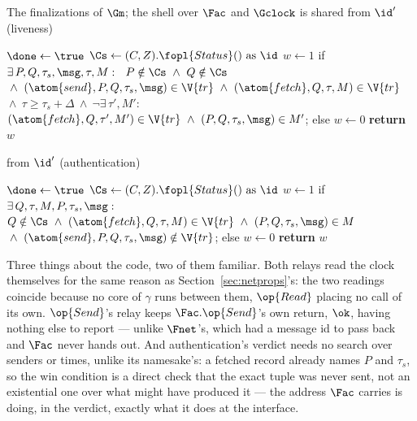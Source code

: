\documentclass[10pt,oneside,openany]{book}
\theoremstyle{accentdef}
\theoremstyle{accentplain}
\begin{document}
\begin{interface}[nofloat]{The finalizations of $\Gm$; the shell over $\Fac$ and $\Gclock$ is shared}
 \quad from $\id'$ \quad (liveness)
\begin{algorithmic}[1]
\algcont
\Req{$\neg\done$}
\State $\done \gets \true$
\State $\Cs \gets (C,Z).\fopl{Status}() \text{ as } \id$
\State $w \gets 1$ if $\exists\, P,Q,\tau_s,\msg,\tau,M :\ \
       P \notin \Cs \ \wedge\ Q \notin \Cs$ \label{ln:gacliv}
\State \quad ${}\wedge\ (\atom{send},P,Q,\tau_s,\msg) \in \V{tr}
       \ \wedge\ (\atom{fetch},Q,\tau,M) \in \V{tr}$
\State \quad ${}\wedge\ \tau \geq \tau_s + \Delta
       \ \wedge\ \neg\exists\, \tau',M' :$
\State \qquad $(\atom{fetch},Q,\tau',M') \in \V{tr} \ \wedge\ (P,Q,\tau_s,\msg) \in M'$;
\State else $w \gets 0$
\State \textbf{return} $w$
\algsave
\end{algorithmic}
\vspace{1.4ex}

 \quad from $\id'$ \quad (authentication)
\begin{algorithmic}[1]
\algcont
\Req{$\neg\done$}
\State $\done \gets \true$
\State $\Cs \gets (C,Z).\fopl{Status}() \text{ as } \id$
\State $w \gets 1$ if $\exists\, Q,\tau,M,P,\tau_s,\msg :$ \label{ln:gacauth}
\State \quad $Q \notin \Cs \ \wedge\ (\atom{fetch},Q,\tau,M) \in \V{tr} \ \wedge\ (P,Q,\tau_s,\msg) \in M$
\State \quad ${}\wedge\ (\atom{send},P,Q,\tau_s,\msg) \notin \V{tr}$;
\State else $w \gets 0$
\State \textbf{return} $w$
\algsave
\end{algorithmic}
\end{interface}

Three things about the code, two of them familiar. Both relays read the clock themselves for the
same reason as Section~\ref{sec:netprops}'s: the two readings coincide because no core of $\gamma$
runs between them, $\op{Read}$ placing no call of its own. $\op{Send}$'s relay keeps
$\Fac.\op{Send}$'s own return, $\ok$, having nothing else to report --- unlike $\Fnet$'s, which had
a message id to pass back and $\Fac$ never hands out. And authentication's verdict needs no search
over senders or times, unlike its namesake's: a fetched record already names $P$ and $\tau_s$, so
the win condition is a direct check that the exact tuple was never sent, not an existential one
over what might have produced it --- the address $\Fac$ carries is doing, in the verdict, exactly
what it does at the interface.
\end{document}
